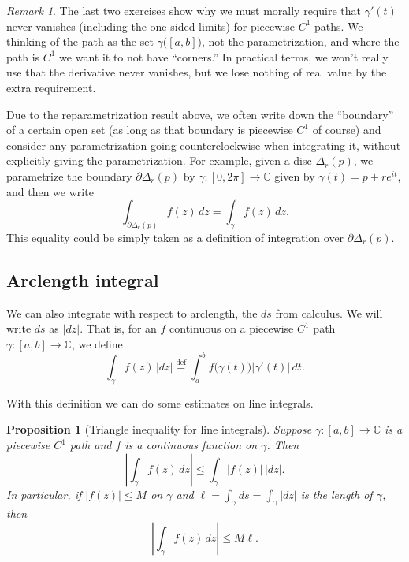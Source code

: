 \documentclass[12pt,openany]{book}
\newcommand{\sabs}[1]{\lvert {#1} \rvert}
\newcommand{\abs}[1]{\left\lvert {#1} \right\rvert}
\newcommand{\C}{{\mathbb{C}}}
\theoremstyle{plain}
\newtheorem{prop}[thm]{Proposition}
\theoremstyle{remark}
\newtheorem{remark}[thm]{Remark}
\theoremstyle{definition}
\theoremstyle{exercise}
\theoremstyle{example}
\begin{document}
\begin{remark}
The last two exercises show why we must morally
require that $\gamma'(t)$ never vanishes (including the one sided limits)
for piecewise $C^1$ paths.
We thinking of the path
as the set
$\gamma\bigl([a,b]\bigr)$,
not the parametrization, and where the path is $C^1$
we want it to not have ``corners.''
In practical terms, we won't really use that the derivative never vanishes,
but we lose nothing of real value by the extra requirement.
\end{remark}

Due to the reparametrization result above,
we often write down the ``boundary'' of a certain open set
(as long as that boundary is piecewise $C^1$ of course)
and consider any parametrization going counterclockwise
when integrating it, without explicitly giving the parametrization.
For example, given a disc $\Delta_r(p)$, we parametrize
the boundary $\partial \Delta_r(p)$ by
$\gamma  \colon [0,2\pi] \to \C$ given by $\gamma(t) = p +
re^{it}$, and then we write
\begin{equation*}
\int_{\partial \Delta_r(p)} f(z) \, dz
=
\int_{\gamma} f(z) \, dz .
\end{equation*}
This equality could be simply taken as a definition of integration over
$\partial \Delta_r(p)$.

\subsection{Arclength integral}

We can also integrate with respect to arclength, the $ds$ from calculus.
We will write $ds$ as $\sabs{dz}$.  That is, for an $f$ continuous on
a piecewise $C^1$ path $\gamma \colon [a,b] \to \C$,
we define
\begin{equation*}
\int_\gamma f(z) \, \sabs{dz}
\overset{\text{def}}{=}
\int_a^b f\bigl( \gamma(t) \bigr) \sabs{\gamma'(t)} \, dt .
\end{equation*}

With this definition we can do some estimates on line integrals.

\begin{prop}[Triangle inequality for line integrals]%
Suppose $\gamma \colon [a,b] \to \C$ is 
a piecewise $C^1$ path and $f$ is a continuous function on
$\gamma$.  Then
\begin{equation*}
\abs{\int_\gamma f(z) \, dz} \leq \int_\gamma \sabs{f(z)} \, \sabs{dz} .
\end{equation*}
In particular, if $\sabs{f(z)} \leq M$ on $\gamma$ and $\ell = \int_\gamma ds
= \int_{\gamma} \sabs{dz}$ is the length of $\gamma$, then
\begin{equation*}
\abs{\int_\gamma f(z) \, dz} \leq M \ell .
\end{equation*}
\end{prop} 
\end{document}
